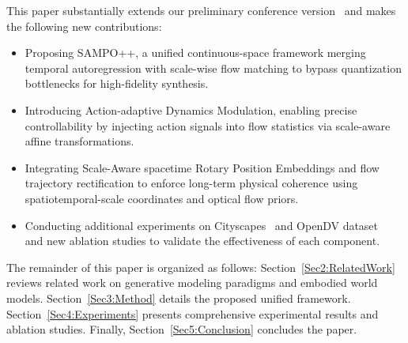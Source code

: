 This paper substantially extends our preliminary conference version~\cite{wang2025sampo} and makes the following new contributions:
\begin{itemize}
    \item Proposing SAMPO++, a unified continuous-space framework merging temporal autoregression with scale-wise flow matching to bypass quantization bottlenecks for high-fidelity synthesis.
    
    \item Introducing Action-adaptive Dynamics Modulation, enabling precise controllability by injecting action signals into flow statistics via scale-aware affine transformations.
    
    \item Integrating Scale-Aware spacetime Rotary Position Embeddings and flow trajectory rectification to enforce long-term physical coherence using spatiotemporal-scale coordinates and optical flow priors.

    \item Conducting additional experiments on Cityscapes~\cite{Cityscapes} and OpenDV dataset~\cite{yang2024genad} and new ablation studies to validate the effectiveness of each component.
\end{itemize}

The remainder of this paper is organized as follows: Section~\ref{Sec2:RelatedWork} reviews related work on generative modeling paradigms and embodied world models. Section~\ref{Sec3:Method} details the proposed unified framework. Section~\ref{Sec4:Experiments} presents comprehensive experimental results and ablation studies. Finally, Section~\ref{Sec5:Conclusion} concludes the paper.

